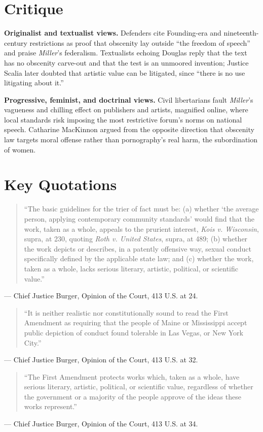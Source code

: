 \documentclass[12pt]{article}
\begin{document}
\section{Critique}

\textbf{Originalist and textualist views.} Defenders cite Founding-era and nineteenth-century restrictions as proof that obscenity lay outside ``the freedom of speech'' and praise \textit{Miller}'s federalism. Textualists echoing Douglas reply that the text has no obscenity carve-out and that the test is an unmoored invention; Justice Scalia later doubted that artistic value can be litigated, since ``there is no use litigating about it.''

\textbf{Progressive, feminist, and doctrinal views.} Civil libertarians fault \textit{Miller}'s vagueness and chilling effect on publishers and artists, magnified online, where local standards risk imposing the most restrictive forum's norms on national speech. Catharine MacKinnon argued from the opposite direction that obscenity law targets moral offense rather than pornography's real harm, the subordination of women.

\section{Key Quotations}

\begin{quote}
``The basic guidelines for the trier of fact must be: (a) whether `the average person, applying contemporary community standards' would find that the work, taken as a whole, appeals to the prurient interest, \textit{Kois v. Wisconsin}, supra, at 230, quoting \textit{Roth v. United States}, supra, at 489; (b) whether the work depicts or describes, in a patently offensive way, sexual conduct specifically defined by the applicable state law; and (c) whether the work, taken as a whole, lacks serious literary, artistic, political, or scientific value.''
\end{quote}
\noindent --- Chief Justice Burger, Opinion of the Court, 413 U.S. at 24.

\begin{quote}
``It is neither realistic nor constitutionally sound to read the First Amendment as requiring that the people of Maine or Mississippi accept public depiction of conduct found tolerable in Las Vegas, or New York City.''
\end{quote}
\noindent --- Chief Justice Burger, Opinion of the Court, 413 U.S. at 32.

\begin{quote}
``The First Amendment protects works which, taken as a whole, have serious literary, artistic, political, or scientific value, regardless of whether the government or a majority of the people approve of the ideas these works represent.''
\end{quote}
\noindent --- Chief Justice Burger, Opinion of the Court, 413 U.S. at 34.
\end{document}
